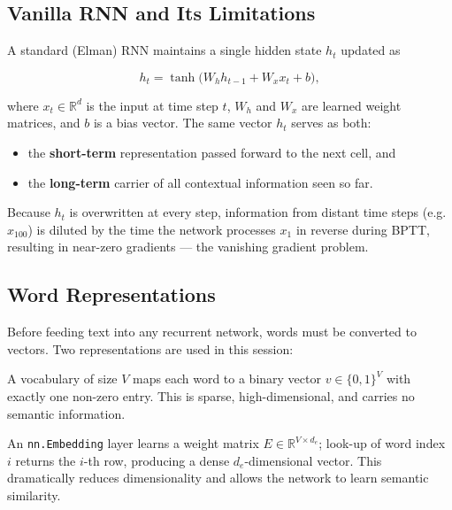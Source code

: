 \documentclass[12pt,a4paper]{article}
\newcommand{\R}{\mathbb{R}}
\begin{document}
\subsection{Vanilla RNN and Its Limitations}
\label{subsec:rnn-limits}

A standard (Elman) RNN maintains a single hidden state $h_t$ updated as

\begin{equation}
  h_t = \tanh\!\bigl(W_h h_{t-1} + W_x x_t + b\bigr),
  \label{eq:rnn-update}
\end{equation}

where $x_t \in \R^d$ is the input at time step $t$, $W_h$ and $W_x$ are
learned weight matrices, and $b$ is a bias vector.
The same vector $h_t$ serves as both:
\begin{itemize}
  \item the \textbf{short-term} representation passed forward to the next cell, and
  \item the \textbf{long-term} carrier of all contextual information seen so far.
\end{itemize}
Because $h_t$ is overwritten at every step, information from distant time steps
(e.g.\ $x_{100}$) is diluted by the time the network processes $x_1$ in
reverse during BPTT, resulting in near-zero gradients --- the vanishing
gradient problem.

\subsection{Word Representations}
\label{subsec:word-rep}

Before feeding text into any recurrent network, words must be converted to
vectors.  Two representations are used in this session:

\begin{description}[style=nextline]
  \item[One-hot vectors] A vocabulary of size $V$ maps each word to a binary
    vector $v \in \{0,1\}^V$ with exactly one non-zero entry.  This is
    sparse, high-dimensional, and carries no semantic information.
  \item[Dense embeddings] An \texttt{nn.Embedding} layer learns a weight matrix
    $E \in \R^{V \times d_e}$; look-up of word index $i$ returns the $i$-th
    row, producing a dense $d_e$-dimensional vector.  This dramatically reduces
    dimensionality and allows the network to learn semantic similarity.
\end{description}
\end{document}
